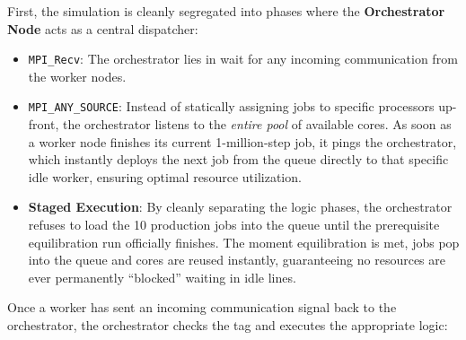 First, the simulation is cleanly segregated into phases where the
\textbf{Orchestrator Node} acts as a central dispatcher:

\begin{Shaded}
\begin{Highlighting}[]
       \OperatorTok{\textless{}} 
\KeywordTok{=}
\KeywordTok{=}
\end{Highlighting}
\end{Shaded}

\begin{itemize}
\tightlist
\item
  \texttt{MPI\_Recv}: The orchestrator lies in wait for any incoming
  communication from the worker nodes.
\item
  \texttt{MPI\_ANY\_SOURCE}: Instead of statically assigning jobs to
  specific processors up-front, the orchestrator listens to the
  \emph{entire pool} of available cores. As soon as a worker node
  finishes its current 1-million-step job, it pings the orchestrator,
  which instantly deploys the next job from the queue directly to that
  specific idle worker, ensuring optimal resource utilization.
\item
  \textbf{Staged Execution}: By cleanly separating the logic phases, the
  orchestrator refuses to load the 10 production jobs into the queue
  until the prerequisite equilibration run officially finishes. The
  moment equilibration is met, jobs pop into the queue and cores are
  reused instantly, guaranteeing no resources are ever permanently
  ``blocked'' waiting in idle lines.
\end{itemize}

Once a worker has sent an incoming communication signal back to the
orchestrator, the orchestrator checks the tag and executes the
appropriate logic:


